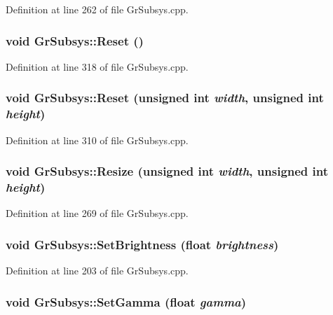 Definition at line 262 of file GrSubsys.cpp.\hypertarget{class_gr_subsys_374bd75973d46d7e9fabcc280e505b22}{
\subsubsection[{Reset}]{\setlength{\rightskip}{0pt plus 5cm}void GrSubsys::Reset ()}}
\label{class_gr_subsys_374bd75973d46d7e9fabcc280e505b22}




Definition at line 318 of file GrSubsys.cpp.\hypertarget{class_gr_subsys_155c0e49f8e45159abf4df5359eb8d6a}{
\subsubsection[{Reset}]{\setlength{\rightskip}{0pt plus 5cm}void GrSubsys::Reset (unsigned int {\em width}, \/  unsigned int {\em height})}}
\label{class_gr_subsys_155c0e49f8e45159abf4df5359eb8d6a}




Definition at line 310 of file GrSubsys.cpp.\hypertarget{class_gr_subsys_9522c885154f2fe8daa62cb8f48529ed}{
\subsubsection[{Resize}]{\setlength{\rightskip}{0pt plus 5cm}void GrSubsys::Resize (unsigned int {\em width}, \/  unsigned int {\em height})}}
\label{class_gr_subsys_9522c885154f2fe8daa62cb8f48529ed}




Definition at line 269 of file GrSubsys.cpp.\hypertarget{class_gr_subsys_f22032c84937955ff0e23eb8b3632379}{
\subsubsection[{SetBrightness}]{\setlength{\rightskip}{0pt plus 5cm}void GrSubsys::SetBrightness (float {\em brightness})}}
\label{class_gr_subsys_f22032c84937955ff0e23eb8b3632379}




Definition at line 203 of file GrSubsys.cpp.\hypertarget{class_gr_subsys_f53962ed44cf2234adf5e07b301adcc0}{
\subsubsection[{SetGamma}]{\setlength{\rightskip}{0pt plus 5cm}void GrSubsys::SetGamma (float {\em gamma})}}
\label{class_gr_subsys_f53962ed44cf2234adf5e07b301adcc0}




